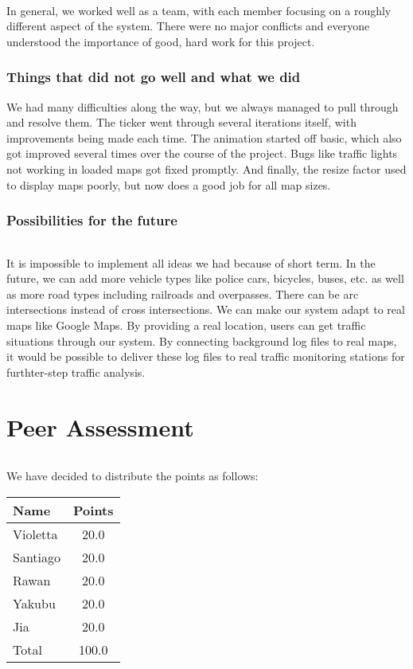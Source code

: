 \documentclass[a4paper,11pt,titlepage]{article}
\begin{document}
\paragraph{}
In general, we worked well as a team, with each member focusing on a roughly different aspect of the system. There were no major conflicts and everyone understood the importance of good, hard work for this project.

\section{Things that did not go well and what we did}
We had many difficulties along the way, but we always managed to pull through and resolve them. The ticker went through several iterations itself, with improvements being made each time. The animation started off basic, which also got improved several times over the course of the project. Bugs like traffic lights not working in loaded maps got fixed promptly. And finally, the resize factor used to display maps poorly, but now does a good job for all map sizes.

\section{Possibilities for the future}
\paragraph{}
It is impossible to implement all ideas we had because of short term. In the future, we can add more vehicle types like police cars, bicycles, buses, etc. as well as more road types including railroads and overpasses. There can be arc intersections instead of cross intersections. We can make our system adapt to real maps like Google Maps. By providing a real location, users can get traffic situations through our system. By connecting background log files to real maps, it would be possible to deliver these log files to real traffic monitoring stations for furthter-step traffic analysis.

\part{Peer Assessment}
\paragraph{}
We have decided to distribute the points as follows:
\begin{center}
\begin{tabular}{ l | c }
  Name & Points \\ \hline
  Violetta & 20.0 \\
  Santiago & 20.0 \\
  Rawan & 20.0 \\
  Yakubu & 20.0 \\ 
  Jia & 20.0\\ \hline \hline
  Total & 100.0\\
  \hline
\end{tabular}
\end{center}
\end{document}
